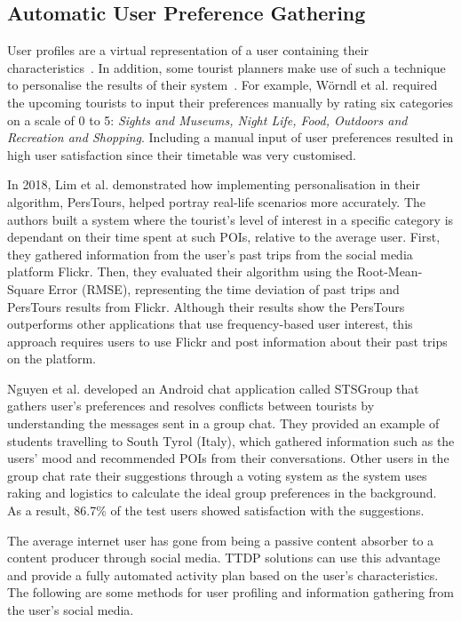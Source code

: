\subsection{Automatic User Preference Gathering}

User profiles are a virtual representation of a user
containing their characteristics~\cite{Cufoglu}. In
addition, some tourist planners make use of such a
technique to personalise the results of their
system~\cite{Worndl2017, Lim2018a, Tumas2009,
Gavalas2015}. For example, Wörndl et al.
\cite{Worndl2017} required the upcoming tourists to
input their preferences manually by rating six
categories on a scale of 0 to 5: \textit{Sights and Museums,
Night Life, Food, Outdoors and Recreation
 and Shopping}. Including a manual input of user
preferences resulted in high user satisfaction since
their timetable was very customised.


In 2018, Lim et al.\cite{Lim2018a} demonstrated how
implementing personalisation in their algorithm,
PersTours, helped portray real-life scenarios more
accurately. The authors built a system where the
tourist’s level of interest in a specific category is
dependant on their time spent at such POIs, relative
to the average user. First, they gathered information
from the user’s past trips from the social media
platform Flickr. Then, they evaluated their algorithm
using the Root-Mean-Square Error (RMSE), representing
the time deviation of past trips and PersTours results
from Flickr. Although their results show the PersTours
outperforms other applications that use
frequency-based user interest, this approach requires
users to use Flickr and post information about their
past trips on the platform.
 
Nguyen et al.\cite{Nguyen2018} developed an Android
chat application called STSGroup that gathers user’s
preferences and resolves conflicts between tourists by
understanding the messages sent in a group chat. They
provided an example of students travelling to South
Tyrol (Italy), which gathered information such as the
users’ mood and recommended POIs from their
conversations. Other users in the group chat rate
their suggestions through a voting system as the
system uses raking and logistics to calculate
the ideal group preferences in the background. As a
result, 86.7\% of the test users showed satisfaction
with the suggestions.  


The average internet user has gone from being a
passive content absorber to a content producer through
social media. TTDP solutions can use this advantage
and provide a fully automated activity plan based on
the user's characteristics. The following are some
methods for user profiling and information gathering
from the user's social media. 


